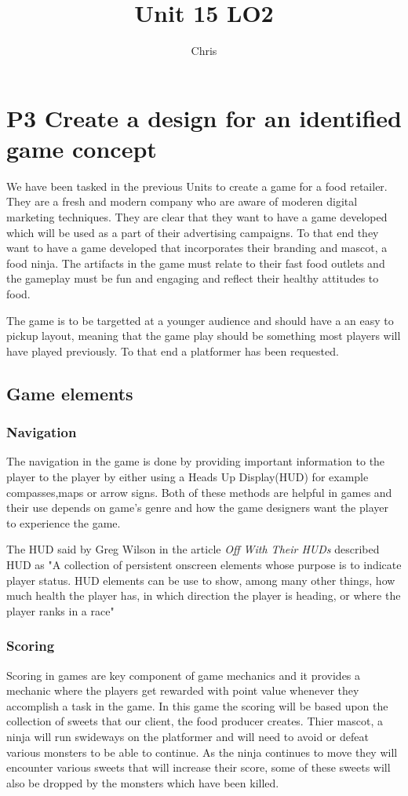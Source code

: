 \documentclass{article}
\title{Unit 15 LO2}
\author{Chris}
\date{}
\begin{document}
\maketitle
\tableofcontents
\break

\section{P3 Create a design for an identified game concept}
We have been tasked in the previous Units to create a game for a food retailer. They are a fresh and modern company who are aware of moderen digital marketing techniques.
They are clear that they want to have a game developed which will be used as a part of their advertising campaigns. To that end they want to have a game developed that incorporates their branding and mascot, a food ninja.
The artifacts in the game must relate to their fast food outlets and the gameplay must be fun and engaging and reflect their healthy attitudes to food. 

The game is to be targetted at a younger audience and should have a an easy to pickup layout, meaning that the game play should be something most players will have played previously. To that end a platformer has been requested. 

\subsection{Game elements}
\subsubsection{Navigation}
The navigation in the game is done by providing important information to the player to the player by either using a Heads Up Display(HUD) for example compasses,maps or arrow signs. Both of these methods are helpful in games and their use depends on game's genre and how the game designers want the player to experience the game.

The HUD said by Greg Wilson in the article \textit{Off With Their HUDs} described HUD as "A collection of persistent onscreen elements whose purpose is to indicate player status. HUD elements can be use to show, among many other things, how much health the player has, in which direction the player is heading, or where the player ranks in a race" 



\subsubsection{Scoring}
Scoring in games are key component of game mechanics and it provides a mechanic where the players get rewarded with point value whenever they accomplish a task in the game.   
In this game the scoring will be based upon the collection of sweets that our client, the food producer creates. Thier mascot, a ninja will run swideways on the platformer and will need to avoid or defeat various monsters to be able to continue. As the ninja continues to move they will encounter various sweets that will increase their score, some of these sweets will also be dropped by the monsters which have been killed.
\end{document}

